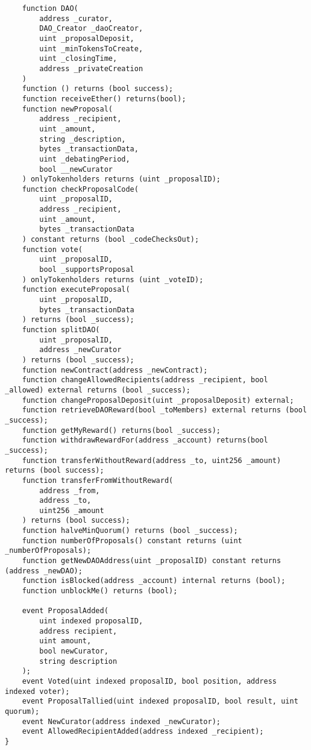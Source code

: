 \documentclass[9pt,oneside]{amsart}
\begin{document}
\begin{verbatim}
    function DAO(
        address _curator,
        DAO_Creator _daoCreator,
        uint _proposalDeposit,
        uint _minTokensToCreate,
        uint _closingTime,
        address _privateCreation
    )
    function () returns (bool success);
    function receiveEther() returns(bool);
    function newProposal(
        address _recipient,
        uint _amount,
        string _description,
        bytes _transactionData,
        uint _debatingPeriod,
        bool __newCurator
    ) onlyTokenholders returns (uint _proposalID);
    function checkProposalCode(
        uint _proposalID,
        address _recipient,
        uint _amount,
        bytes _transactionData
    ) constant returns (bool _codeChecksOut);
    function vote(
        uint _proposalID,
        bool _supportsProposal
    ) onlyTokenholders returns (uint _voteID);
    function executeProposal(
        uint _proposalID,
        bytes _transactionData
    ) returns (bool _success);
    function splitDAO(
        uint _proposalID,
        address _newCurator
    ) returns (bool _success);
    function newContract(address _newContract);
    function changeAllowedRecipients(address _recipient, bool _allowed) external returns (bool _success);
    function changeProposalDeposit(uint _proposalDeposit) external;
    function retrieveDAOReward(bool _toMembers) external returns (bool _success);
    function getMyReward() returns(bool _success);
    function withdrawRewardFor(address _account) returns(bool _success);
    function transferWithoutReward(address _to, uint256 _amount) returns (bool success);
    function transferFromWithoutReward(
        address _from,
        address _to,
        uint256 _amount
    ) returns (bool success);
    function halveMinQuorum() returns (bool _success);
    function numberOfProposals() constant returns (uint _numberOfProposals);
    function getNewDAOAddress(uint _proposalID) constant returns (address _newDAO);
    function isBlocked(address _account) internal returns (bool);
    function unblockMe() returns (bool);

    event ProposalAdded(
        uint indexed proposalID,
        address recipient,
        uint amount,
        bool newCurator,
        string description
    );
    event Voted(uint indexed proposalID, bool position, address indexed voter);
    event ProposalTallied(uint indexed proposalID, bool result, uint quorum);
    event NewCurator(address indexed _newCurator);
    event AllowedRecipientAdded(address indexed _recipient);
}

\end{verbatim}
\end{document}
